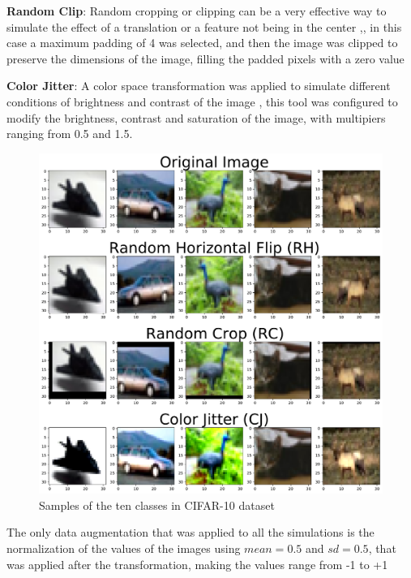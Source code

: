 \documentclass[10pt,twocolumn,letterpaper]{article}
\begin{document}
\textbf{Random Clip}: Random cropping or clipping can be a very effective way to simulate the effect of a translation or a feature not being in the center \cite{Shorten2019},, in this case a maximum padding of 4 was selected, and then the image was clipped to preserve the dimensions of the image, filling the padded pixels with a zero value

\textbf{Color Jitter}: A color space transformation was applied to simulate different conditions of brightness and contrast of the image \cite{Shorten2019}, this tool was configured to modify the brightness, contrast and saturation of the image, with multipiers ranging from 0.5 and 1.5.

\begin{figure}[h]
	\begin{center}
		\includegraphics[width=1.0\linewidth]{samples_images_transformation.pdf}
	\end{center}
	\caption{Samples of the ten classes in CIFAR-10 dataset}
	\label{fig:samples}
\end{figure}


The only data augmentation that was applied to all the simulations is the normalization of the values of the images using $mean = 0.5$ and $sd = 0.5$, that was applied after the transformation, making the values range from -1 to +1
\end{document}
